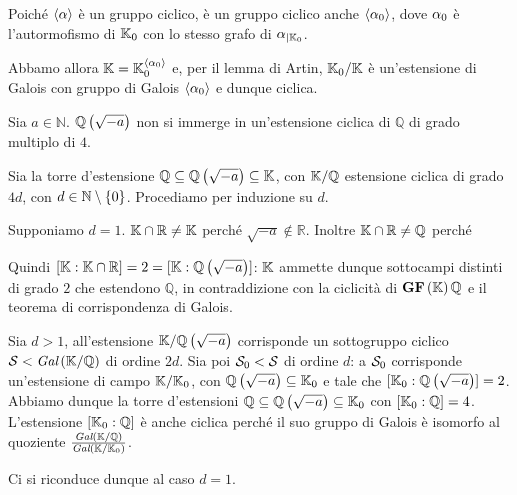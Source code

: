 \Proof
Poich\'e $\left < \alpha \right >$ \`e un gruppo ciclico,
\`e un gruppo ciclico anche $\left < \alpha_0 \right >$, dove
$\alpha_0$ \`e l'autormofismo di $\mathbb{K}_0$ con lo stesso
grafo di ${\alpha}_{|\mathbb{K}_0}$.
\par
Abbamo allora $\mathbb{K} = \mathbb{K}_0^{\left < \alpha_0 \right >}$ e,
per il lemma di Artin, $\mathbb{K}_0/\mathbb{K}$ \`e
un'estensione di Galois con gruppo di Galois $\left < \alpha_0 \right >$
e dunque ciclica.
\EndProof
\begin{Theorem}
	Sia $a \in \mathbb{N}$. $\mathbb{Q} \left ( \sqrt{-a} \right )$
	non si immerge in un'estensione ciclica di $\mathbb{Q}$ di grado
	multiplo di $4$.
\end{Theorem}
\Proof
Sia la torre d'estensione
$\mathbb{Q} \subseteq
\mathbb{Q} \left ( \sqrt{-a} \right ) \subseteq
\mathbb{K}$,
con $\mathbb{K}/\mathbb{Q}$ estensione ciclica
di grado $4d$, con $d \in \mathbb{N} \setminus \lbrace 0 \rbrace$.
Procediamo per induzione su $d$.
\par
Supponiamo $d = 1$.
$\mathbb{K} \cap \mathbb{R} \neq \mathbb{K}$ perch\'e
$\sqrt{-a} \notin \mathbb{R}$.
Inoltre $\mathbb{K} \cap \mathbb{R} \neq \mathbb{Q}$ perch\'e
\par
Quindi
$[\mathbb{K}:\mathbb{K} \cap \mathbb{R}] = 2 =
[\mathbb{K}:\mathbb{Q} \left ( \sqrt{-a} \right )]$:
$\mathbb{K}$ ammette dunque sottocampi distinti di grado $2$ che estendono
$\mathbb{Q}$, in contraddizione con la ciclicit\`a di
$\textbf{GF} \left ( \mathbb{K} \right ){\mathbb{Q}}$ e il teorema di corrispondenza di
Galois.
\par
Sia $d > 1$, all'estensione
$\mathbb{K}/\mathbb{Q} \left ( \sqrt{-a} \right )$
corrisponde un sottogruppo ciclico
$\mathcal{S} < \textit{Gal} \left ( \mathbb{K}/\mathbb{Q} \right )$ di ordine $2d$.
Sia poi $\mathcal{S}_0 < \mathcal{S}$ di ordine $d$: a $\mathcal{S}_0$
corrisponde un'estensione di campo $\mathbb{K}/\mathbb{K}_0$,
con
$\mathbb{Q} \left ( \sqrt{-a} \right ) \subseteq \mathbb{K}_0$ e tale che
$[\mathbb{K}_0:\mathbb{Q} \left ( \sqrt{-a} \right )] = 2$.
Abbiamo dunque la torre d'estensioni
$\mathbb{Q} \subseteq \mathbb{Q} \left ( \sqrt{-a} \right ) \subseteq
\mathbb{K}_0$ con
$[\mathbb{K}_0:\mathbb{Q}] = 4$.
L'estensione $[\mathbb{K}_0:\mathbb{Q}]$ \`e anche ciclica
perch\'e il suo gruppo di Galois \`e isomorfo al quoziente
$\frac{\textit{Gal} \left ( \mathbb{K}/\mathbb{Q} \right )}{\textit{Gal} \left ( \mathbb{K}/\mathbb{K}_0 \right )}$.
\par
Ci si riconduce dunque al caso $d = 1$.
\EndProof
